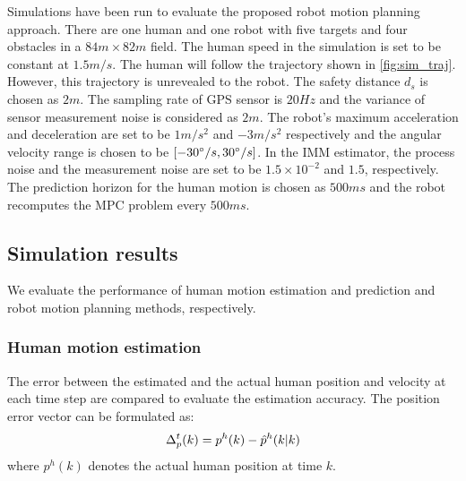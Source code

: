 \documentclass[letterpaper, 10 pt, conference]{ieeeconf}
\begin{document}
Simulations have been run to evaluate the proposed robot motion planning approach. 
There are one human and one robot with five targets and four obstacles in a $84 m\times 82 m$ field. 
The human speed in the simulation is set to be constant at $1.5m/s$. 
The human will follow the trajectory shown in \cref{fig:sim_traj}.
However, this trajectory is unrevealed to the robot.
The safety distance $d_s$ is chosen as $2m$.
The sampling rate of GPS sensor is $20Hz$ and the variance of sensor measurement noise is considered as $2m$. 
The robot's maximum acceleration and deceleration are set to be $1 m/s^2$ and $-3 m/s^2$ respectively and the angular velocity range is chosen to be $[-30\degree/s,30\degree/s]$.
In the IMM estimator, the process noise and the measurement noise are set to be $1.5\times 10^{-2}$ and $1.5$, respectively.
The prediction horizon for the human motion is chosen as $500ms$ and the robot recomputes the MPC problem every $500ms$.

\subsection{Simulation results}
We evaluate the performance of human motion estimation and prediction and robot motion planning methods, respectively.
\subsubsection{Human motion estimation}\label{subsubsec:motion_est}
The error between the estimated and the actual human position and velocity at each time step are compared to evaluate the estimation accuracy.
The position error vector can be formulated as:
\[
\Delta^{t}_p(k)=p^h(k)-\hat{p}^h(k|k)\label{eqn:track_err_pos}\\
\]
where $p^h(k)$ denotes the actual human position at time $k$. 




\end{document}
